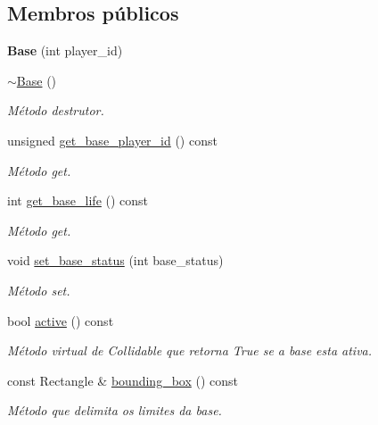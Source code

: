 \subsection*{Membros públicos}
\begin{DoxyCompactItemize}
\item 
\mbox{\label{classBase_af39d4ba491dea383a8250c6d58919f21}} 
{\bfseries Base} (int player\+\_\+id)
\item 
\mbox{\hyperlink{classBase_a722da881b6c70cfcbde9243abcfbf334}{$\sim$\+Base}} ()
\begin{DoxyCompactList}\small\item\em Método destrutor. \end{DoxyCompactList}\item 
unsigned \mbox{\hyperlink{classBase_ace6b801fb729303a97c6edf0c5e38f70}{get\+\_\+base\+\_\+player\+\_\+id}} () const
\begin{DoxyCompactList}\small\item\em Método get. \end{DoxyCompactList}\item 
int \mbox{\hyperlink{classBase_a0bbcf57387f5860d74f6d2c4b9aecfba}{get\+\_\+base\+\_\+life}} () const
\begin{DoxyCompactList}\small\item\em Método get. \end{DoxyCompactList}\item 
void \mbox{\hyperlink{classBase_a580dc7cdb6ff87350d04d494616839ea}{set\+\_\+base\+\_\+status}} (int base\+\_\+status)
\begin{DoxyCompactList}\small\item\em Método set. \end{DoxyCompactList}\item 
bool \mbox{\hyperlink{classBase_abc6031bf03072e10f4d8635dd226b01c}{active}} () const
\begin{DoxyCompactList}\small\item\em Método virtual de Collidable que retorna True se a base esta ativa. \end{DoxyCompactList}\item 
const Rectangle \& \mbox{\hyperlink{classBase_a28fbf5f8b4e7e774f47298b76268159f}{bounding\+\_\+box}} () const
\begin{DoxyCompactList}\small\item\em Método que delimita os limites da base. \end{DoxyCompactList}\item 

\end{DoxyCompactItemize}
